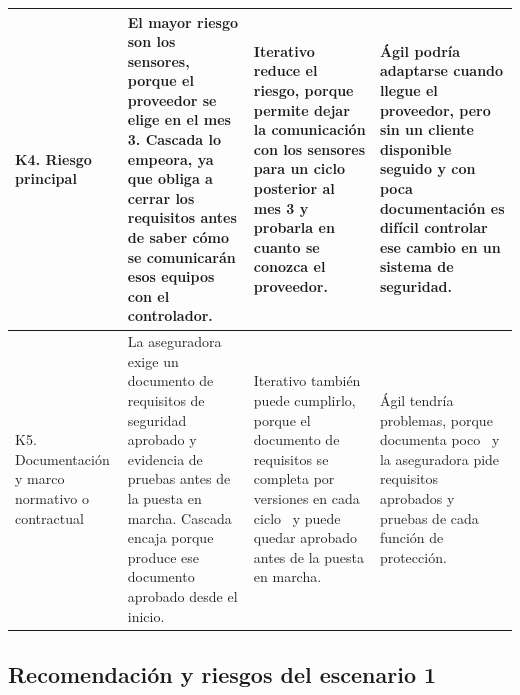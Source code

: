 {\begin{xltabular}{\textwidth}{|>{\raggedright\arraybackslash}p{2.6cm}|L|L|L|}
K4. Riesgo principal & El mayor riesgo son los sensores, porque el proveedor se elige en el mes 3. Cascada lo empeora, ya que obliga a cerrar los requisitos antes de saber cómo se comunicarán esos equipos con el controlador. & Iterativo reduce el riesgo, porque permite dejar la comunicación con los sensores para un ciclo posterior al mes 3 y probarla en cuanto se conozca el proveedor. & Ágil podría adaptarse cuando llegue el proveedor, pero sin un cliente disponible seguido y con poca documentación es difícil controlar ese cambio en un sistema de seguridad. \\ \hline
K5. Documentación y marco normativo o contractual & La aseguradora exige un documento de requisitos de seguridad aprobado y evidencia de pruebas antes de la puesta en marcha. Cascada encaja porque produce ese documento aprobado desde el inicio. & Iterativo también puede cumplirlo, porque el documento de requisitos se completa por versiones en cada ciclo~\cite{iso29148} y puede quedar aprobado antes de la puesta en marcha. & Ágil tendría problemas, porque documenta poco~\cite{inayat2015} y la aseguradora pide requisitos aprobados y pruebas de cada función de protección. \\ \hline
\end{xltabular}
}

\subsection{Recomendación y riesgos del escenario 1}

